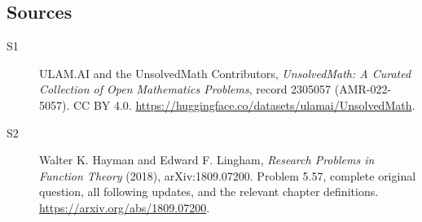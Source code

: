 \documentclass[11pt]{book}
\begin{document}
\subsection{Sources}
\begin{description}
\item[\hypertarget{source:2305057:1}{S1}] ULAM.AI and the UnsolvedMath Contributors, \emph{UnsolvedMath: A Curated Collection of Open Mathematics Problems}, record 2305057 (AMR-022-5057). CC BY 4.0. \url{https://huggingface.co/datasets/ulamai/UnsolvedMath}.
\item[\hypertarget{source:2305057:2}{S2}] Walter K. Hayman and Edward F. Lingham, \emph{Research Problems in Function Theory} (2018), arXiv:1809.07200. Problem 5.57, complete original question, all following updates, and the relevant chapter definitions. \url{https://arxiv.org/abs/1809.07200}.
\end{description}
\label{end:2305057}
\end{document}
